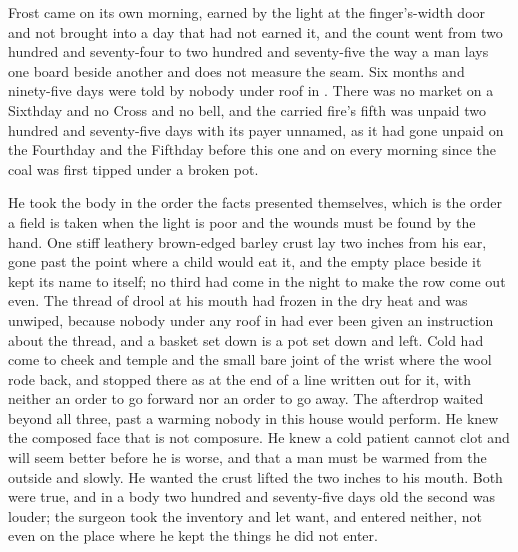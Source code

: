 
Frost came on its own morning, earned by the light at the finger's-width door and not brought into a day that had not earned it, and the count went from two hundred and seventy-four to two hundred and seventy-five the way a man lays one board beside another and does not measure the seam. Six months and ninety-five days were told by nobody under  roof in . There was no market on a Sixthday and no Cross and no bell, and the carried fire's fifth was unpaid two hundred and seventy-five days with its payer unnamed, as it had gone unpaid on the Fourthday and the Fifthday before this one and on every morning since the coal was first tipped under a broken pot.

He took the body in the order the facts presented themselves, which is the order a field is taken when the light is poor and the wounds must be found by the hand. One stiff leathery brown-edged barley crust lay two inches from his ear, gone past the point where a child would eat it, and the empty place beside it kept its name to itself; no third had come in the night to make the row come out even. The thread of drool at his mouth had frozen in the dry heat and was unwiped, because nobody under any roof in  had ever been given an instruction about the thread, and a basket set down is a pot set down and left. Cold had come to cheek and temple and the small bare joint of the wrist where the wool rode back, and stopped there as at the end of a line written out for it, with neither an order to go forward nor an order to go away. The afterdrop waited beyond all three, past a warming nobody in this house would perform. He knew the composed face that is not composure. He knew a cold patient cannot clot and will seem better before he is worse, and that a man must be warmed from the outside and slowly. He wanted the crust lifted the two inches to his mouth. Both were true, and in a body two hundred and seventy-five days old the second was louder; the surgeon took the inventory and let  want, and entered neither, not even on the place where he kept the things he did not enter.

